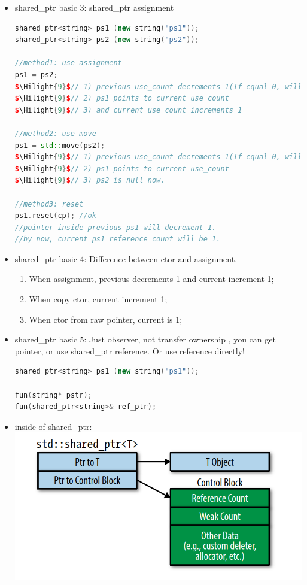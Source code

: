\documentclass[a4paper,12pt,twoside]{book}
\newcommand{\Hilight}[1]{\makebox[0pt][l]{\color{yellow}\rule[-3pt]{#1em}{11pt}}}
\begin{document}
\begin{itemize}
\item shared\_ptr basic 3: shared\_ptr assignment
\begin{lstlisting}[frame=single, language=c++, mathescape=true]
shared_ptr<string> ps1 (new string("ps1"));
shared_ptr<string> ps2 (new string("ps2"));

//method1: use assignment
ps1 = ps2;
$\Hilight{9}$// 1) previous use_count decrements 1(If equal 0, will delete)
$\Hilight{9}$// 2) ps1 points to current use_count
$\Hilight{9}$// 3) and current use_count increments 1

//method2: use move
ps1 = std::move(ps2);
$\Hilight{9}$// 1) previous use_count decrements 1(If equal 0, will delete)
$\Hilight{9}$// 2) ps1 points to current use_count
$\Hilight{9}$// 3) ps2 is null now. 

//method3: reset
ps1.reset(cp); //ok
//pointer inside previous ps1 will decrement 1.
//by now, current ps1 reference count will be 1.
\end{lstlisting}

\item shared\_ptr basic 4: Difference between ctor and assignment.
\begin{enumerate}
\item When assignment, previous decrements 1 and current increment 1;
\item When copy ctor, current increment 1;
\item When ctor from raw pointer, current is 1;
\end{enumerate}

\item shared\_ptr basic 5: Just observer, not transfer ownership , you can get pointer, or use shared\_ptr reference. Or use reference directly!
\begin{lstlisting}[frame=single, language=c++]
shared_ptr<string> ps1 (new string("ps1"));

fun(string* pstr);
fun(shared_ptr<string>& ref_ptr);
\end{lstlisting}

\item inside of shared\_ptr: \newline
\includegraphics[scale=0.8]{pics/shared.png}


\end{itemize}
\end{document}
